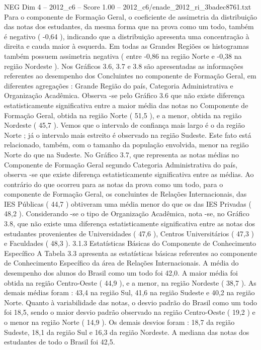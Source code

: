 \begin{textsample}{NEG Dim 4 – 2012\_c6 – Score 1.00 – 2012\_c6/enade\_2012\_ri\_3badec8761.txt}
Para o componente de Formação Geral, o coeficiente de assimetria da distribuição das notas dos estudantes, da mesma forma que na prova como um todo, também é negativo ( -0,64 ), indicando que a distribuição apresenta uma concentração à direita e cauda maior à esquerda.
Em todas as Grandes Regiões os histogramas também possuem assimetria negativa ( entre -0,86 na região Norte e -0,38 na região Nordeste ).
Nos Gráficos 3.6, 3.7 e 3.8 são apresentadas as informações referentes ao desempenho dos Concluintes no componente de Formação Geral, em diferentes agregações : Grande Região do país, Categoria Administrativa e Organização Acadêmica.
Observa -se pelo Gráfico 3.6 que não existe diferença estatisticamente significativa entre a maior média das notas no Componente de Formação Geral, obtida na região Norte ( 51,5 ), e a menor, obtida na região Nordeste ( 45,7 ).
Vemos que o intervalo de confiança mais largo é o da região Norte ; já o intervalo mais estreito é observado na região Sudeste.
Este fato está relacionado, também, com o tamanho da população envolvida, menor na região Norte do que na Sudeste.
No Gráfico 3.7, que representa as notas médias no Componente de Formação Geral segundo Categoria Administrativa do país, observa -se que existe diferença estatisticamente significativa entre as médias.
Ao contrário do que ocorreu para as notas da prova como um todo, para o componente de Formação Geral, os concluintes de Relações Internacionais, das IES Públicas ( 44,7 ) obtiveram uma média menor do que os das IES Privadas ( 48,2 ).
Considerando -se o tipo de Organização Acadêmica, nota -se, no Gráfico 3.8, que não existe uma diferença estatisticamente significativa entre as notas dos estudantes provenientes de Universidades ( 47,6 ), Centros Universitários ( 47,3 ) e Faculdades ( 48,3 ). 3.1.3 Estatísticas Básicas do Componente de Conhecimento Específico A Tabela 3.3 apresenta as estatísticas básicas referentes ao componente de Conhecimento Específico da área de Relações Internacionais.
A média do desempenho dos alunos do Brasil como um todo foi 42,0.
A maior média foi obtida na região Centro-Oeste ( 44,9 ), e a menor, na região Nordeste ( 38,7 ).
As demais médias foram : 43,4 na região Sul, 41,6 na região Sudeste e 40,2 na região Norte.
Quanto à variabilidade das notas, o desvio padrão do Brasil como um todo foi 18,5, sendo o maior desvio padrão observado na região Centro-Oeste ( 19,2 ) e o menor na região Norte ( 14,9 ).
Os demais desvios foram : 18,7 da região Sudeste, 18,1 da região Sul e 16,3 da região Nordeste.
A mediana das notas dos estudantes de todo o Brasil foi 42,5.

\end{textsample}
